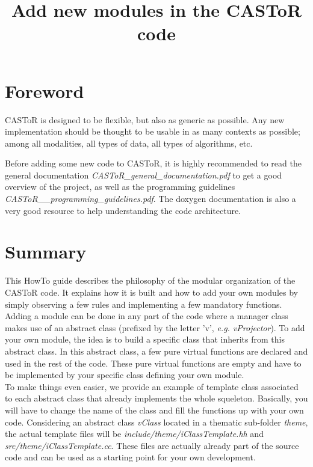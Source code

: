 \documentclass[a4paper, 11pt]{article}
\begin{document}
\title{Add new modules in the CASToR code}
\maketitle

\section*{Foreword}

CASToR is designed to be flexible, but also as generic as possible.
Any new implementation should be thought to be usable in as many contexts as possible; among all modalities, all types of data, all types of algorithms, etc.

Before adding some new code to CASToR, it is highly recommended to read the general documentation \textit{CASToR\_general\_documentation.pdf} to get a good overview of the project, as well as the programming guidelines \textit{CASToR\_\_programming\_guidelines.pdf}.
The doxygen documentation is also a very good resource to help understanding the code architecture.

\section{Summary}

This HowTo guide describes the philosophy of the modular organization of the CASToR code.
It explains how it is built and how to add your own modules by simply observing a few rules and implementing a few mandatory functions.\\

Adding a module can be done in any part of the code where a manager class makes use of an abstract class (prefixed by the letter 'v', \textit{e.g. vProjector}).
To add your own module, the idea is to build a specific class that inherits from this abstract class.
In this abstract class, a few pure virtual functions are declared and used in the rest of the code.
These pure virtual functions are empty and have to be implemented by your specific class defining your own module.\\

To make things even easier, we provide an example of template class associated to each abstract class that already implements the whole squeleton.
Basically, you will have to change the name of the class and fill the functions up with your own code.
Considering an abstract class \textit{vClass} located in a thematic sub-folder \textit{theme}, the actual template files will be \textit{include/theme/iClassTemplate.hh} and \textit{src/theme/iClassTemplate.cc}.
These files are actually already part of the source code and can be used as a starting point for your own development.\\
\end{document}
